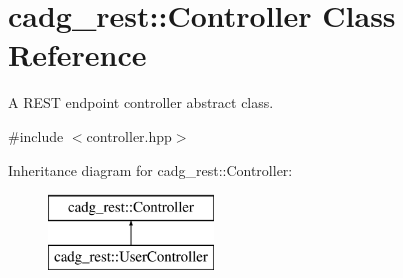 \hypertarget{classcadg__rest_1_1_controller}{}\section{cadg\+\_\+rest\+::Controller Class Reference}
\label{classcadg__rest_1_1_controller}


A R\+E\+ST endpoint controller abstract class.  




{\ttfamily \#include $<$controller.\+hpp$>$}

Inheritance diagram for cadg\+\_\+rest\+::Controller\+:\begin{figure}[H]
\begin{center}
\leavevmode
\includegraphics[height=2.000000cm]{classcadg__rest_1_1_controller}
\end{center}
\end{figure}
